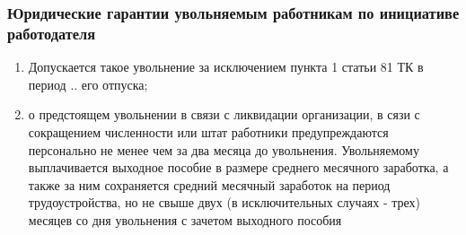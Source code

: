 \subsubsection{Юридические гарантии увольняемым работникам по инициативе работодателя}
\begin{enumerate}
	\item Допускается такое увольнение за исключением пункта 1 статьи 81 ТК в период .. его отпуска;
	\item о предстоящем увольнении в связи с ликвидации организации, в сязи с сокращением численности или штат работники предупреждаются персонально не менее чем за два месяца до увольнения. Увольняемому выплачивается выходное пособие в размере среднего месячного заработка, а также за ним сохраняется средний месячный заработок на период трудоустройства, но не свыше двух (в исключительных случаях - трех) месяцев со дня увольнения с зачетом выходного пособия 
\end{enumerate}
